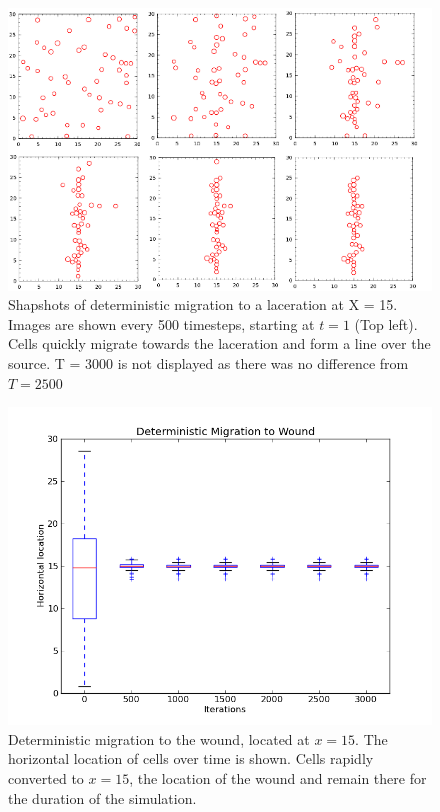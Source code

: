 \documentclass[12pt]{article}
\begin{document}
\begin{figure}[H]
\centering
\includegraphics[width=14.41cm]{media/Collated_determinstic.png}
\caption{Shapshots of deterministic 
migration to a laceration at X = 15. Images are shown every 500 timesteps, 
starting at \(t = 1\) (Top left). Cells quickly migrate towards the laceration and 
form a line over the source. T = 3000 is not displayed as there was no 
difference from \(T = 2500\)}
\end{figure}

\begin{figure}[h]
\centering
\includegraphics[width=11.51cm]{media/DetMigrationtoWound.png}
\caption{Deterministic migration to the wound, located at \(x=15\). The horizontal location
  of cells over time is shown. Cells rapidly converted to \(x=15\), the 
location of the wound and remain there for the duration of the 
simulation.}
\end{figure}
\end{document}
